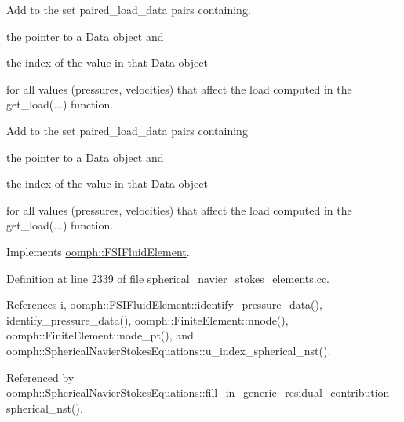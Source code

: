 Add to the set {\ttfamily paired\+\_\+load\+\_\+data} pairs containing. 


\begin{DoxyItemize}
\item the pointer to a \hyperlink{classoomph_1_1Data}{Data} object and
\item the index of the value in that \hyperlink{classoomph_1_1Data}{Data} object
\end{DoxyItemize}for all values (pressures, velocities) that affect the load computed in the {\ttfamily get\+\_\+load}(...) function.

Add to the set {\ttfamily paired\+\_\+load\+\_\+data} pairs containing
\begin{DoxyItemize}
\item the pointer to a \hyperlink{classoomph_1_1Data}{Data} object and
\item the index of the value in that \hyperlink{classoomph_1_1Data}{Data} object
\end{DoxyItemize}for all values (pressures, velocities) that affect the load computed in the {\ttfamily get\+\_\+load}(...) function. 

Implements \hyperlink{classoomph_1_1FSIFluidElement_a13c5f835cddd1b78e6d2582733619300}{oomph\+::\+F\+S\+I\+Fluid\+Element}.



Definition at line 2339 of file spherical\+\_\+navier\+\_\+stokes\+\_\+elements.\+cc.



References i, oomph\+::\+F\+S\+I\+Fluid\+Element\+::identify\+\_\+pressure\+\_\+data(), identify\+\_\+pressure\+\_\+data(), oomph\+::\+Finite\+Element\+::nnode(), oomph\+::\+Finite\+Element\+::node\+\_\+pt(), and oomph\+::\+Spherical\+Navier\+Stokes\+Equations\+::u\+\_\+index\+\_\+spherical\+\_\+nst().



Referenced by oomph\+::\+Spherical\+Navier\+Stokes\+Equations\+::fill\+\_\+in\+\_\+generic\+\_\+residual\+\_\+contribution\+\_\+spherical\+\_\+nst().

\mbox{\label{classoomph_1_1QSphericalCrouzeixRaviartElement_a1fc00abb3eec401fe649f920267bc7f0}} 
